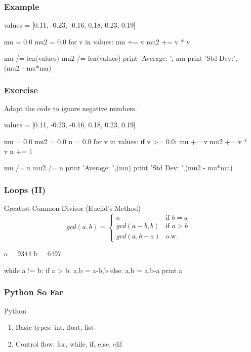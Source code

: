 \begin{frame}[fragile]
\frametitle{Example}

\begin{python}
values = [0.11, -0.23, -0.16, 0.18, 0.23, 0.19]

mu = 0.0
mu2 = 0.0
for v in values:
    mu += v
    mu2 += v * v

mu /= len(values)
mu2 /= len(values)
print 'Average: ', mu
print 'Std Dev:', (mu2 - mu*mu)
\end{python}
\end{frame}

\begin{frame}[fragile]
\frametitle{Exercise}

Adapt the code to ignore negative numbers.

\pause

\begin{python}
values = [0.11, -0.23, -0.16, 0.18, 0.23, 0.19]

mu = 0.0
mu2 = 0.0
n = 0.0
for v in values:
    if v >= 0.0:
        mu += v
        mu2 += v * v
        n += 1

mu /= n
mu2 /= n
print 'Average: ',(mu)
print 'Std Dev: ',(mu2 - mu*mu)
\end{python}

\end{frame}


\begin{frame}[fragile]
\frametitle{Loops (II)}

\begin{block}{Greatest Common Divisor (Euclid's Method)}
\[
gcd(a,b) = \begin{cases}
            a & \text{if $b = a$}\\
            gcd(a-b, b) & \text{if $a > b$} \\
            gcd(a, b-a) & \text{o.w.}
            \end{cases}
\]
\end{block}

\pause
\begin{python}
a = 9344
b = 6497

while a != b:
    if a > b:
        a,b = a-b,b
    else:
        a,b = a,b-a
print a
\end{python}

\end{frame}

\begin{frame}[fragile]
\frametitle{Python So Far}

\begin{block}{Python}
\begin{enumerate}
\item Basic types: int, float, list
\item Control flow: for, while, if, else, elif
\end{enumerate}
\end{block}

\end{frame}


